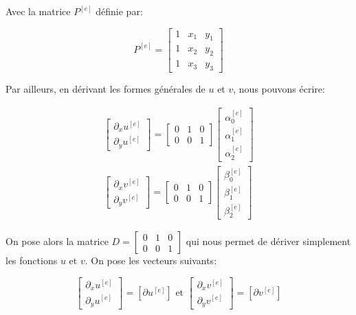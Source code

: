 \documentclass{article}
\begin{document}
Avec la matrice $P^{[e]}$ définie par:

\begin{equation}
    P^{[e]} = \begin{bmatrix}
        1 & x_1 & y_1 \\
        1 & x_2 & y_2 \\
        1 & x_3 & y_3
    \end{bmatrix}
\end{equation}

Par ailleurs, en dérivant les formes générales
de $u$ et $v$, nous pouvons écrire:

\begin{align}
    \begin{bmatrix}
    \partial_x u^{[e]} \\ \partial_y u^{[e]}
    \end{bmatrix}
    =
    \begin{bmatrix}
    0 & 1 & 0 \\
    0 & 0 & 1
    \end{bmatrix}
    \begin{bmatrix}
    \alpha_0^{[e]} \\ \alpha_1^{[e]} \\ \alpha_2^{[e]}
    \end{bmatrix} \\
    \begin{bmatrix}
    \partial_x v^{[e]} \\ \partial_y v^{[e]}
    \end{bmatrix}
    =
    \begin{bmatrix}
    0 & 1 & 0 \\
    0 & 0 & 1
    \end{bmatrix}
    \begin{bmatrix}
    \beta_0^{[e]} \\ \beta_1^{[e]} \\ \beta_2^{[e]}
    \end{bmatrix}
\end{align}

On pose alors la matrice $D =
\begin{bmatrix}
    0 & 1 & 0 \\
    0 & 0 & 1
\end{bmatrix} $
qui nous permet de dériver simplement les fonctions $u$ et $v$.
On pose les vecteurs suivants:

\begin{equation}
    \begin{bmatrix}
        \partial_x u^{[e]} \\ \partial_y u^{[e]}
    \end{bmatrix}
    =
    \left[ \partial u^{[e]} \right]
    \text{ et }
    \begin{bmatrix}
        \partial_x v^{[e]} \\ \partial_y v^{[e]}
    \end{bmatrix}
    =
    \left[ \partial v^{[e]} \right]
\end{equation}
\end{document}
